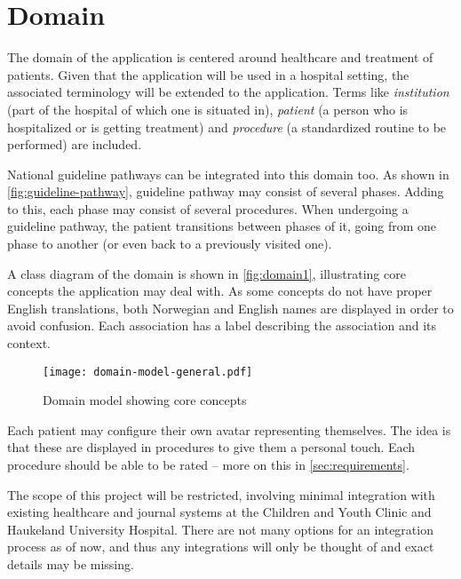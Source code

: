
\section{Domain}
\label{sec:domain}

The domain of the application is centered around healthcare and treatment of patients. Given that the application will be used in a hospital setting, the associated terminology will be extended to the application. Terms like \emph{institution} (part of the hospital of which one is situated in), \emph{patient} (a person who is hospitalized or is getting treatment) and \emph{procedure} (a standardized routine to be performed) are included.

National guideline pathways can be integrated into this domain too. As shown in \autoref{fig:guideline-pathway}, guideline pathway may consist of several phases. Adding to this, each phase may consist of several procedures. When undergoing a guideline pathway, the patient transitions between phases of it, going from one phase to another (or even back to a previously visited one).

A class diagram of the domain is shown in \autoref{fig:domain1}, illustrating core concepts the application may deal with. As some concepts do not have proper English translations, both Norwegian and English names are displayed in order to avoid confusion. Each association has a label describing the association and its context.

\begin{figure}
    \centering
    \texttt{[image: domain-model-general.pdf]}
    \caption{Domain model showing core concepts}
    \label{fig:domain1}
\end{figure}

Each patient may configure their own avatar representing themselves. The idea is that these are displayed in procedures to give them a personal touch. Each procedure should be able to be rated -- more on this in \autoref{sec:requirements}.

The scope of this project will be restricted, involving minimal integration with existing healthcare and journal systems at the Children and Youth Clinic and Haukeland University Hospital. There are not many options for an integration process as of now, and thus any integrations will only be thought of and exact details may be missing.

